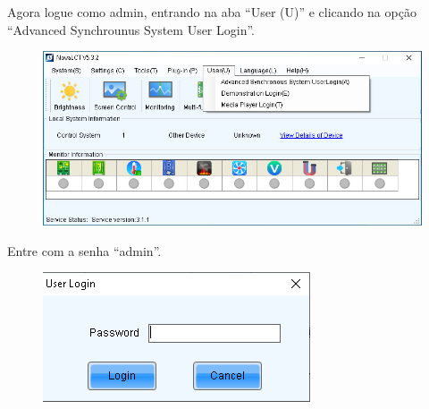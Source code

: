 \documentclass[12pt, a4paper]{article}
\begin{document}
	Agora logue como admin, entrando na aba ``User (U)'' e clicando na opção ``Advanced Synchrounus System User Login''.
	\begin{figure}[!htb]
		\centering
		\includegraphics[width=\textwidth]{CS2.jpeg}
		\caption{\label{fig:CS2.jpeg}}
	\end{figure}

	Entre com a senha ``admin''.
	\begin{figure}[!htb]
		\centering
		\includegraphics[width=.6\textwidth]{CS3.jpeg}
		\caption{\label{fig:CS3.jpeg}}
	\end{figure}
\cleardoublepage

\end{document}
